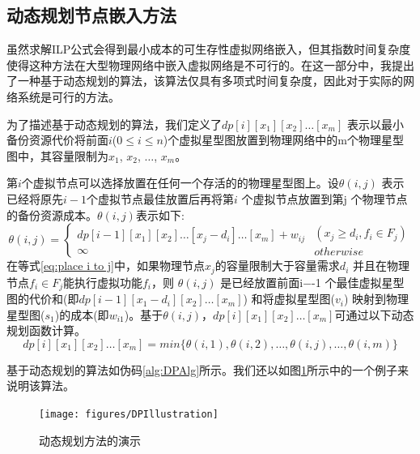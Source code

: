 \subsection{动态规划节点嵌入方法}
\label{lab:DynamicProgrammingEquation}
虽然求解ILP公式会得到最小成本的可生存性虚拟网络嵌入，但其指数时间复杂度使得这种方法在大型物理网络中嵌入虚拟网络是不可行的。在这一部分中，我提出了一种基于动态规划的算法，该算法仅具有多项式时间复杂度，因此对于实际的网络系统是可行的方法。

为了描述基于动态规划的算法，我们定义了$dp[i][{x_1}][{x_2}] \ldots [{x_m}]$ 表示以最小备份资源代价将前面$i$($0 \le i \le n $)个虚拟星型图放置到物理网络中的m个物理星型图中，其容量限制为$ x_1$, $ x_2$, $\ldots$, $x_m$。

第$i$个虚拟节点可以选择放置在任何一个存活的的物理星型图上。设$\theta (i,j)$ 表示已经将原先$i-1$个虚拟节点最佳放置后再将第$i$ 个虚拟节点放置到第j 个物理节点的备份资源成本。$\theta (i,j)$表示如下:
\begin{equation}
\theta (i,j) = \left\{ {\begin{array}{*{20}{c}}
{dp[i - 1][x_1][{x_2}] \ldots [{x_j} - {d_i}] \ldots [{x_m}] + {w_{ij}}}\\
\infty
\end{array}} \right.\begin{array}{*{20}{c}}
{({x_j} \ge {d_i},{f_i} \in {F_j})}\\
{otherwise}
\end{array}
\label{eq:place i to j}
\end{equation}
在等式\ref{eq:place i to j}中，如果物理节点$x_j$的容量限制大于容量需求$d_i$ 并且在物理节点${f_i} \in {F_j}$能执行虚拟功能$f_i$，则 $\theta (i,j)$ 是已经放置前面i−-1 个最佳虚拟星型图的代价和(即$dp[i-1][{x_1} - {d_i}][{x_2}] \ldots [{x_m}]$) 和将虚拟星型图($v_i$) 映射到物理星型图($s_1$)的成本(即$w_{i1}$)。基于$\theta (i,j)$，$dp[i][{x_1}][{x_2}] \ldots [{x_m}]$可通过以下动态规划函数计算。
\begin{equation}
dp[i][{x_1}][{x_2}] \ldots [{x_m}] = min\{\theta (i,1),\theta (i,2),\ldots,\theta (i,j),\ldots,\theta (i,m)\}
\label{eq:update function}
\end{equation}

基于动态规划的算法如伪码\ref{alg:DPAlg}所示。我们还以如图\ref{fig:DPIllustration}所示中的一个例子来说明该算法。


\begin{figure}[htb]
\centering
\texttt{[image: figures/DPIllustration]}\\
  \caption{动态规划方法的演示}\label{fig:DPIllustration}
\end{figure}


